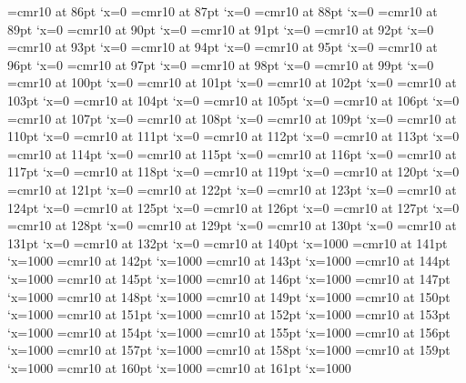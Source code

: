 \font\F=cmr10 at 86pt \lpcode\F`x=0
\font\F=cmr10 at 87pt \lpcode\F`x=0
\font\F=cmr10 at 88pt \lpcode\F`x=0
\font\F=cmr10 at 89pt \lpcode\F`x=0
\font\F=cmr10 at 90pt \lpcode\F`x=0
\font\F=cmr10 at 91pt \lpcode\F`x=0
\font\F=cmr10 at 92pt \lpcode\F`x=0
\font\F=cmr10 at 93pt \lpcode\F`x=0
\font\F=cmr10 at 94pt \lpcode\F`x=0
\font\F=cmr10 at 95pt \lpcode\F`x=0
\font\F=cmr10 at 96pt \lpcode\F`x=0
\font\F=cmr10 at 97pt \lpcode\F`x=0
\font\F=cmr10 at 98pt \lpcode\F`x=0
\font\F=cmr10 at 99pt \lpcode\F`x=0
\font\F=cmr10 at 100pt \lpcode\F`x=0
\font\F=cmr10 at 101pt \lpcode\F`x=0
\font\F=cmr10 at 102pt \lpcode\F`x=0
\font\F=cmr10 at 103pt \lpcode\F`x=0
\font\F=cmr10 at 104pt \lpcode\F`x=0
\font\F=cmr10 at 105pt \lpcode\F`x=0
\font\F=cmr10 at 106pt \lpcode\F`x=0
\font\F=cmr10 at 107pt \lpcode\F`x=0
\font\F=cmr10 at 108pt \lpcode\F`x=0
\font\F=cmr10 at 109pt \lpcode\F`x=0
\font\F=cmr10 at 110pt \lpcode\F`x=0
\font\F=cmr10 at 111pt \lpcode\F`x=0
\font\F=cmr10 at 112pt \lpcode\F`x=0
\font\F=cmr10 at 113pt \lpcode\F`x=0
\font\F=cmr10 at 114pt \lpcode\F`x=0
\font\F=cmr10 at 115pt \lpcode\F`x=0
\font\F=cmr10 at 116pt \lpcode\F`x=0
\font\F=cmr10 at 117pt \lpcode\F`x=0
\font\F=cmr10 at 118pt \lpcode\F`x=0
\font\F=cmr10 at 119pt \lpcode\F`x=0
\font\F=cmr10 at 120pt \lpcode\F`x=0
\font\F=cmr10 at 121pt \lpcode\F`x=0
\font\F=cmr10 at 122pt \lpcode\F`x=0
\font\F=cmr10 at 123pt \lpcode\F`x=0
\font\F=cmr10 at 124pt \lpcode\F`x=0
\font\F=cmr10 at 125pt \lpcode\F`x=0
\font\F=cmr10 at 126pt \lpcode\F`x=0
\font\F=cmr10 at 127pt \lpcode\F`x=0
\font\F=cmr10 at 128pt \lpcode\F`x=0
\font\F=cmr10 at 129pt \lpcode\F`x=0
\font\F=cmr10 at 130pt \lpcode\F`x=0
\font\F=cmr10 at 131pt \lpcode\F`x=0
\font\F=cmr10 at 132pt \lpcode\F`x=0
\font\F=cmr10 at 140pt \efcode\F`x=1000
\font\F=cmr10 at 141pt \efcode\F`x=1000
\font\F=cmr10 at 142pt \efcode\F`x=1000
\font\F=cmr10 at 143pt \efcode\F`x=1000
\font\F=cmr10 at 144pt \efcode\F`x=1000
\font\F=cmr10 at 145pt \efcode\F`x=1000
\font\F=cmr10 at 146pt \efcode\F`x=1000
\font\F=cmr10 at 147pt \efcode\F`x=1000
\font\F=cmr10 at 148pt \efcode\F`x=1000
\font\F=cmr10 at 149pt \efcode\F`x=1000
\font\F=cmr10 at 150pt \efcode\F`x=1000
\font\F=cmr10 at 151pt \efcode\F`x=1000
\font\F=cmr10 at 152pt \efcode\F`x=1000
\font\F=cmr10 at 153pt \efcode\F`x=1000
\font\F=cmr10 at 154pt \efcode\F`x=1000
\font\F=cmr10 at 155pt \efcode\F`x=1000
\font\F=cmr10 at 156pt \efcode\F`x=1000
\font\F=cmr10 at 157pt \efcode\F`x=1000
\font\F=cmr10 at 158pt \efcode\F`x=1000
\font\F=cmr10 at 159pt \efcode\F`x=1000
\font\F=cmr10 at 160pt \efcode\F`x=1000
\font\F=cmr10 at 161pt \efcode\F`x=1000
